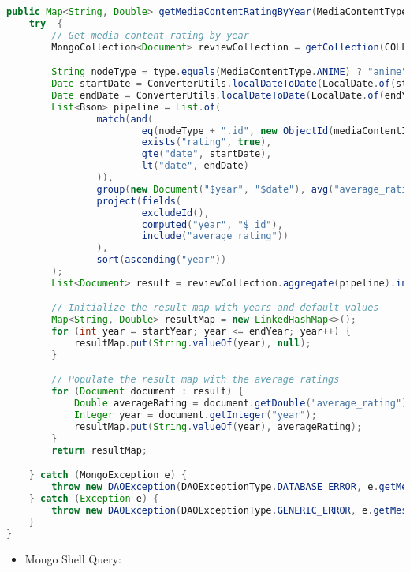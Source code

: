 \begin{mdframed}[style=customstyle]
\begin{lstlisting}[language=java]
public Map<String, Double> getMediaContentRatingByYear(MediaContentType type, String mediaContentId, int startYear, int endYear) throws  DAOException {
    try  {
        // Get media content rating by year
        MongoCollection<Document> reviewCollection = getCollection(COLLECTION_NAME);

        String nodeType = type.equals(MediaContentType.ANIME) ? "anime" : "manga";
        Date startDate = ConverterUtils.localDateToDate(LocalDate.of(startYear, 1, 1));
        Date endDate = ConverterUtils.localDateToDate(LocalDate.of(endYear + 1, 1, 1));
        List<Bson> pipeline = List.of(
                match(and(
                        eq(nodeType + ".id", new ObjectId(mediaContentId)),
                        exists("rating", true),
                        gte("date", startDate),
                        lt("date", endDate)
                )),
                group(new Document("$year", "$date"), avg("average_rating", "$rating")),
                project(fields(
                        excludeId(),
                        computed("year", "$_id"),
                        include("average_rating"))
                ),
                sort(ascending("year"))
        );
        List<Document> result = reviewCollection.aggregate(pipeline).into(new ArrayList<>());

        // Initialize the result map with years and default values
        Map<String, Double> resultMap = new LinkedHashMap<>();
        for (int year = startYear; year <= endYear; year++) {
            resultMap.put(String.valueOf(year), null);
        }

        // Populate the result map with the average ratings
        for (Document document : result) {
            Double averageRating = document.getDouble("average_rating");
            Integer year = document.getInteger("year");
            resultMap.put(String.valueOf(year), averageRating);
        }
        return resultMap;

    } catch (MongoException e) {
        throw new DAOException(DAOExceptionType.DATABASE_ERROR, e.getMessage());
    } catch (Exception e) {
        throw new DAOException(DAOExceptionType.GENERIC_ERROR, e.getMessage());
    }
}\end{lstlisting}
\end{mdframed}
    
\begin{itemize}
    \item Mongo Shell Query:
\end{itemize}

